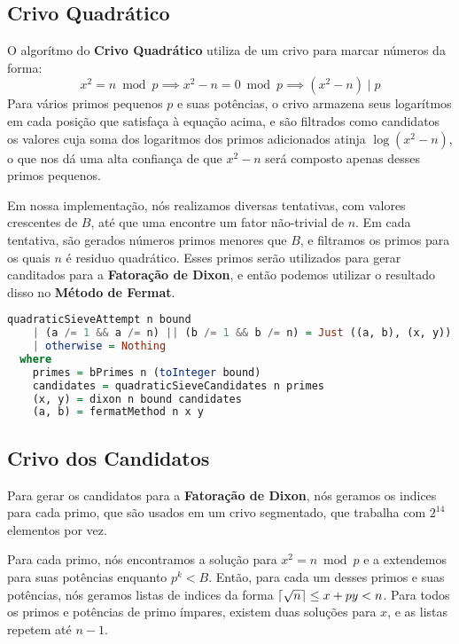 \documentclass{article}
\newcommand{\divides}{\mid}
\DeclarePairedDelimiter{\ceil}{\lceil}{\rceil}
\begin{document}
\subsection{Crivo Quadrático}
\label{quadraticSieve}
O algorítmo do \textbf{Crivo Quadrático} utiliza de um crivo para marcar números da forma:
$$ x^2 = n \bmod p \implies x^2 - n = 0 \bmod p \implies (x^2 - n) \divides p $$
Para vários primos pequenos $p$ e suas potências, o crivo armazena seus logarítmos em cada posição que satisfaça à equação acima, e são filtrados como candidatos os valores cuja soma dos logaritmos dos primos adicionados atinja $\log (x^2 - n)$, o que nos dá uma alta confiança de que $x^2 - n$ será composto apenas desses primos pequenos.

\begin{minipage}{0.9\linewidth}
Em nossa implementação, nós realizamos diversas tentativas, com valores crescentes de $B$, até que uma encontre um fator não-trivial de $n$. Em cada tentativa, são gerados números primos menores que $B$, e filtramos os primos para os quais $n$ é residuo quadrático. Esses primos serão utilizados para gerar canditados para a \textbf{Fatoração de Dixon}, e então podemos utilizar o resultado disso no \textbf{Método de Fermat}.

\begin{lstlisting}[language=haskell,caption=Crivo Quadrático - Principal]
quadraticSieveAttempt n bound
    | (a /= 1 && a /= n) || (b /= 1 && b /= n) = Just ((a, b), (x, y))
    | otherwise = Nothing
  where
    primes = bPrimes n (toInteger bound)
    candidates = quadraticSieveCandidates n primes
    (x, y) = dixon n bound candidates
    (a, b) = fermatMethod n x y
\end{lstlisting}
\end{minipage}

\subsection{Crivo dos Candidatos}
\label{sieve}
Para gerar os candidatos para a \textbf{Fatoração de Dixon}, nós geramos os indices para cada primo, que são usados em um crivo segmentado, que trabalha com $2^{14}$ elementos por vez.

Para cada primo, nós encontramos a solução para $x^2 = n \bmod p$ e a extendemos para suas potências enquanto $p^k < B$.
Então, para cada um desses primos e suas potências, nós geramos listas de indices da forma $\ceil{\sqrt{n}} \leq x + py < n$. Para todos os primos e potências de primo ímpares, existem duas soluções para $x$, e as listas repetem até $n-1$.
\end{document}
